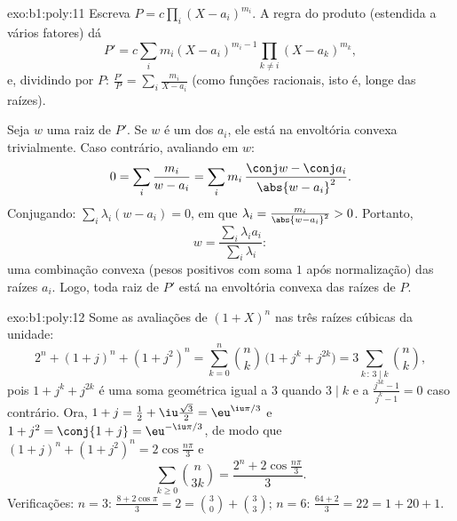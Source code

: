 \begin{solution}{exo:b1:poly:11}
Escreva $P = c\prod_i (X - a_i)^{m_i}$. A regra do produto (estendida a
vários fatores) dá
\[
P' = c\sum_{i} m_i (X - a_i)^{m_i - 1} \prod_{k \neq i} (X -
a_k)^{m_k},
\]
e, dividindo por $P$: $\frac{P'}{P} = \sum_i \frac{m_i}{X - a_i}$
(como funções racionais, isto é, longe das raízes).

Seja $w$ uma raiz de $P'$. Se $w$ é um dos $a_i$, ele está na
envoltória convexa trivialmente. Caso contrário, avaliando em $w$:
\[
0 = \sum_i \frac{m_i}{w - a_i}
= \sum_i m_i\, \frac{\conj w - \conj a_i}{\abs{w - a_i}^2} .
\]
Conjugando: $\sum_i \lambda_i (w - a_i) = 0$, em que $\lambda_i =
\frac{m_i}{\abs{w - a_i}^2} > 0$. Portanto,
\[
w = \frac{\sum_i \lambda_i a_i}{\sum_i \lambda_i} :
\]
uma combinação convexa (pesos positivos com soma $1$ após
normalização) das raízes $a_i$. Logo, toda raiz de $P'$ está na
envoltória convexa das raízes de $P$.
\end{solution}

\begin{solution}{exo:b1:poly:12}
Some as avaliações de $(1 + X)^n$ nas três raízes cúbicas da
unidade:
\[
2^n + (1 + j)^n + (1 + j^2)^n
= \sum_{k=0}^n \binom nk\,\bigl(1 + j^k + j^{2k}\bigr)
= 3\sum_{k\,:\,3\mid k}\binom nk ,
\]
pois $1 + j^k + j^{2k}$ é uma soma geométrica igual a $3$ quando $3
\mid k$ e a $\frac{j^{3k} - 1}{j^k - 1} = 0$ caso contrário. Ora, $1 +
j = \frac12 + \iu\frac{\sqrt3}2 = \eu^{\iu\pi/3}$ e $1 + j^2 =
\conj{1 + j} = \eu^{-\iu\pi/3}$, de modo que $(1+j)^n + (1+j^2)^n =
2\cos\frac{n\pi}3$ e
\[
\sum_{k\geq0}\binom n{3k} = \frac{2^n + 2\cos\frac{n\pi}3}{3} .
\]
Verificações: $n = 3$: $\frac{8 + 2\cos\pi}3 = 2 = \binom30 + \binom33$;
$n = 6$: $\frac{64 + 2}3 = 22 = 1 + 20 + 1$.
\end{solution}

